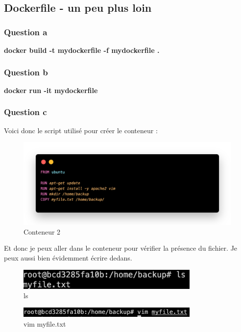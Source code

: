 \documentclass[12pt, a4paper]{article}
\begin{document}
\subsection{Dockerfile - un peu plus loin}
\subsubsection{Question a}
\textbf{docker build -t mydockerfile -f mydockerfile .}

\subsubsection{Question b}
\textbf{docker run -it mydockerfile}

\newpage
\subsubsection{Question c}
Voici donc le script utilisé pour créer le conteneur :

\begin{figure}[h]
    \centering
    \includegraphics[width=1\textwidth]{img/code2.png}
    \caption{Conteneur 2}
    \label{fig:cont}
\end{figure}
Et donc je peux aller dans le conteneur pour vérifier la présence du fichier.
Je peux aussi bien évidemment écrire dedans.
\begin{figure}[h]
    \centering
    \includegraphics[width=0.8\textwidth]{img/vim1.png}
    \caption{ls}
    \label{fig:vim1}
\end{figure}
\begin{figure}[h]
    \centering
    \includegraphics[width=0.8\textwidth]{img/vim2.png}
    \caption{vim myfile.txt}
    \label{fig:con1t}
\end{figure}
\end{document}
